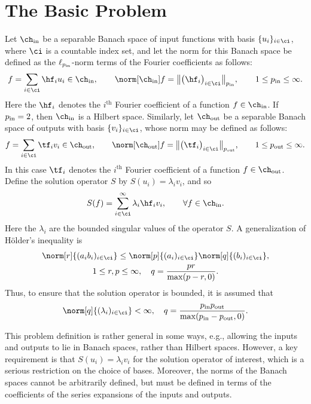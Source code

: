 \documentclass[final]{elsarticle}
\newcommand{\chin}{\ch_{\text{\rm{in}}}}
\newcommand{\chout}{\ch_{\text{\rm{out}}}}
\newcommand{\pin}{p_{\text{\rm{in}}}}
\newcommand{\pout}{p_{\text{\rm{out}}}}
\theoremstyle{definition}
\theoremstyle{remark}
\begin{document}
\section{The Basic Problem}
Let $\chin$ be a separable Banach space of input functions with basis $\{u_i\}_{i\in\ci}$, where $\ci$ is a countable index set, and let the norm for this Banach space be defined as the $\ell_{\pin}$-norm terms of the Fourier coefficients as follows:
\begin{equation*}
f = \sum_{i \in \ci} \hf_i u_i \in \chin, \qquad \norm[\chin]{f}=\big\lVert\big(\hf_i\big)_{i\in \ci}\big\rVert_{\pin}, \qquad 1 \le \pin \le \infty.
\end{equation*}
Here the $\hf_i$ denotes the $i^{\text{th}}$ Fourier coefficient of a function $f\in \chin$.  If $\pin=2$, then $\chin$ is a Hilbert space.  Similarly, let $\chout$ be a separable Banach space of outputs  with basis $\{v_i\}_{i \in \ci}$, whose norm may be defined as follows:
\begin{equation*}
f = \sum_{i \in \ci} \tf_i v_i \in \chout, \qquad \norm[\chout]{f}=\big\lVert\big(\tf_i\big)_{i\in \ci}\big\rVert_{\pout}, \qquad 1 \le \pout \le \infty.
\end{equation*}
In this case $\tf_i$ denotes the $i^{\text{th}}$ Fourier coefficient of a function $f\in \chout$.  Define the solution operator $S$ by $S(u_i) = \lambda_i v_i$, and so
\begin{equation} \label{HilbertS}
S(f) = \sum_{i \in \ci}^\infty \lambda_i \hf_i v_i, \qquad \forall f \in \chin.
\end{equation}
Here the $\lambda_i$ are the bounded singular values of the operator $S$.  A generalization of H\"older's inequality is
\begin{multline} \label{HoldIneq}
\norm[r]{(a_ib_i)_{i \in \ci}} \le \norm[p]{(a_i)_{i \in \ci}} \norm[q]{(b_i)_{i \in \ci}}, \\
1 \le r, p \le \infty, \quad  q= \frac{pr}{\max(p-r,0)}.
\end{multline}
Thus, to ensure that the solution operator is bounded, it is assumed that
\begin{equation} \label{lamcond}
\norm[q]{(\lambda_i)_{i \in \ci}}<\infty, \quad  q= \frac{\pin\pout}{\max(\pin-\pout,0)}.
\end{equation}

This problem definition is rather general in some ways, e.g., allowing the inputs and outputs to lie in Banach spaces, rather than Hilbert spaces.  However, a key requirement is that $S(u_i)=\lambda_i v_i$ for the solution operator of interest, which is a serious restriction on the choice of bases.  Moreover, the norms of the Banach spaces cannot be arbitrarily defined, but must be defined in terms of the coefficients of the series expansions of the inputs and outputs.
\end{document}
